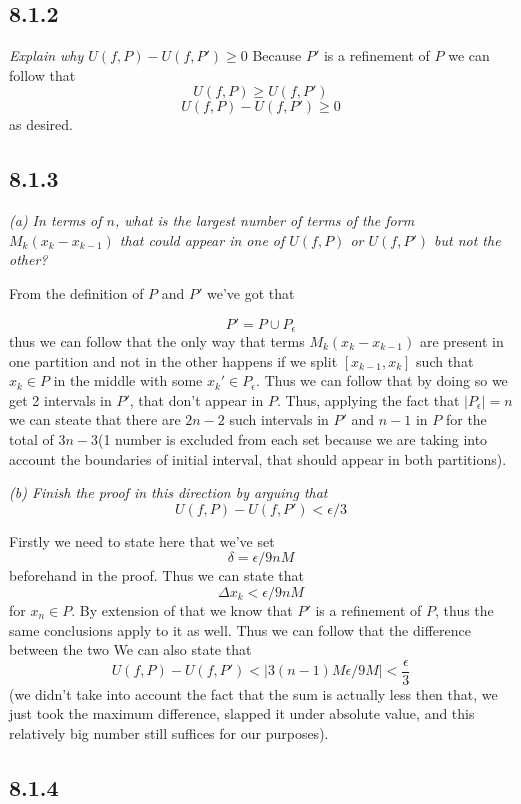\documentclass[11pt,oneside,titlepage]{book}
\begin{document}
\subsection*{8.1.2}

\textit{Explain why $U(f, P) - U(f, P') \geq 0$}
Because $P'$ is a refinement of $P$ we can follow that
$$U(f, P) \geq U(f, P')$$
$$U(f, P) - U(f, P') \geq 0$$
as desired.

\subsection*{8.1.3}

\textit{(a) In terms of $n$, what is the largest number of terms of the form
  $M_k(x_k - x_{k - 1})$ that could appear in one of $U(f, P)$ or $U(f, P')$
  but not the other?}

From the definition of $P$ and $P'$ we've got that

$$P' = P \cup P_\epsilon$$
thus we can follow that the only way that terms $M_k(x_k - x_{k - 1})$ are
present in one partition and not in the other happens if we split
$[x_{k - 1}, x_k]$ such that $x_k \in P$ in the middle with some
$x_k' \in P_\epsilon$. Thus we can follow that by doing so we get 2 intervals
in $P'$, that don't appear in $P$. Thus, applying the fact that $|P_\epsilon| = n$
we can steate that there are $2n - 2$ such intervals in $P'$ and $n - 1$ in
$P$ for the total of $3n - 3$(1 number is  excluded from each set because
we are taking into account the boundaries of initial interval, that should appear in
both partitions).

\textit{(b) Finish the proof in this direction by arguing that}
$$ U(f, P) - U(f, P') < \epsilon / 3$$

Firstly we need to state here that we've set
$$\delta = \epsilon/9nM$$
beforehand in the proof. Thus we can state that
$$\Delta x_k < \epsilon/9nM$$
for $x_n \in P$. By extension of that we know that $P'$
is a refinement of $P$, thus the
same conclusions apply to it as well. Thus we can follow that
the difference between the two We can also state that
$$ U(f, P) - U(f, P') < |3(n - 1)M \epsilon/9M| < \frac{\epsilon}{3} $$
(we didn't take into account the fact that the sum is actually less then that, we
just took the maximum difference, slapped it under absolute value, and this relatively
big number still suffices for our purposes).

\subsection*{8.1.4}
\end{document}
